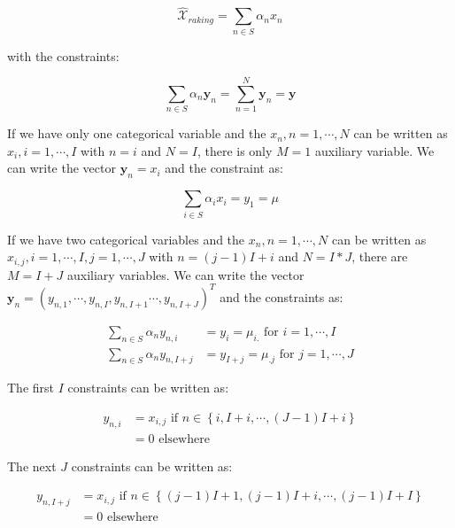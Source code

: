 \documentclass{tex/note}
\begin{document}
\begin{equation*}
\hat{\mathcal{X}}_{raking}  = \sum_{n \in S} \alpha_n x_n  
\end{equation*}
    
with the constraints:

\begin{equation*}
\sum_{n \in S} \alpha_n \bm{y}_n = \sum_{n = 1}^N \bm{y}_n = \bm{y}
\end{equation*}

If we have only one categorical variable and the $x_n , n = 1 , \cdots , N$ can be written as $x_i , i = 1 , \cdots , I$ with $n = i$ and $N = I$, there is only $M = 1$ auxiliary variable. We can write the vector $\bm{y}_n = x_i$ and the constraint as:

\begin{equation*}
\sum_{i \in S} \alpha_i x_i = y_1 = \mu
\end{equation*}

If we have two categorical variables and the $x_n , n = 1 , \cdots , N$ can be written as $x_{i,j} , i = 1 , \cdots , I, j = 1 , \cdots , J$ with $n = \left(j-1\right) I + i$ and $N = I * J$, there are $M = I + J$ auxiliary variables. We can write the vector $\bm{y}_n = \left( y_{n,1} , \cdots , y_{n,I} , y_{n,I+1} \cdots , y_{n,I+J} \right) ^T$ and the constraints as:

\begin{align*}
\sum_{n \in S} \alpha_n y_{n,i} &= y_i = \mu_{i.} \text{ for } i = 1 , \cdots , I \\
\sum_{n \in S} \alpha_n y_{n,I + j} &= y_{I + j} = \mu_{.j} \text{ for } j = 1 , \cdots , J
\end{align*}

The first $I$ constraints can be written as:

\begin{align*}
y_{n,i} &= x_{i,j} \text{ if } n \in \left\{ i , I + i , \cdots , \left(J-1\right) I + i \right\} \\
&= 0 \text{ elsewhere}
\end{align*}

The next $J$ constraints can be written as:

\begin{align*}
y_{n,I+j} &= x_{i,j} \text{ if } n \in \left\{ \left(j-1\right) I + 1 , \left(j-1\right) I + i , \cdots , \left(j-1\right) I + I \right\} \\
&= 0 \text{ elsewhere}
\end{align*}
\end{document}
